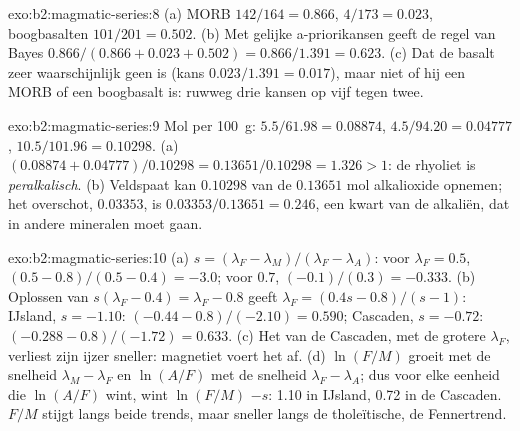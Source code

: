 \begin{solution}{exo:b2:magmatic-series:8}
(a) MORB $142/164 = 0.866$,  $4/173 = 0.023$, boogbasalten $101/201 =
0.502$. (b) Met gelijke a-priorikansen geeft de regel van Bayes $0.866/(0.866 + 0.023 + 0.502) =
0.866/1.391 = 0.623$. (c) Dat de basalt zeer waarschijnlijk geen  is
(kans $0.023/1.391 = 0.017$), maar niet of hij een MORB of een boogbasalt is:
ruwweg drie kansen op vijf tegen twee.
\end{solution}

\begin{solution}{exo:b2:magmatic-series:9}
Mol per \qty{100}{g}:  $5.5/61.98 = 0.08874$,  $4.5/94.20 =
0.04777$,  $10.5/101.96 = 0.10298$. (a) $(0.08874 + 0.04777)/0.10298 =
0.13651/0.10298 = 1.326 > 1$: de rhyoliet is \emph{peralkalisch}. (b) Veldspaat kan
$0.10298$ van de $0.13651$ mol alkalioxide opnemen; het overschot, $0.03353$, is
$0.03353/0.13651 = 0.246$, een kwart van de alkaliën, dat in andere mineralen moet gaan.
\end{solution}

\begin{solution}{exo:b2:magmatic-series:10}
(a) $s = (\lambda_F - \lambda_M)/(\lambda_F - \lambda_A)$: voor $\lambda_F = 0.5$, $(0.5
- 0.8)/(0.5 - 0.4) = -3.0$; voor $0.7$, $(-0.1)/(0.3) = -0.333$. (b) Oplossen van
$s(\lambda_F - 0.4) = \lambda_F - 0.8$ geeft $\lambda_F = (0.4s - 0.8)/(s - 1)$:
IJsland, $s = -1.10$: $(-0.44 - 0.8)/(-2.10) = 0.590$; Cascaden, $s = -0.72$:
$(-0.288 - 0.8)/(-1.72) = 0.633$. (c) Het  van de Cascaden, met de grotere
$\lambda_F$, verliest zijn ijzer sneller: magnetiet voert het af. (d) $\ln(F/M)$ groeit met de
snelheid $\lambda_M - \lambda_F$ en $\ln(A/F)$ met de snelheid $\lambda_F - \lambda_A$; dus
voor elke eenheid die $\ln(A/F)$ wint, wint $\ln(F/M)$ $-s$: 1.10 in IJsland, 0.72 in de
Cascaden. $F/M$ stijgt langs beide trends, maar sneller langs de tholeïtische, de
Fennertrend.
\end{solution}


